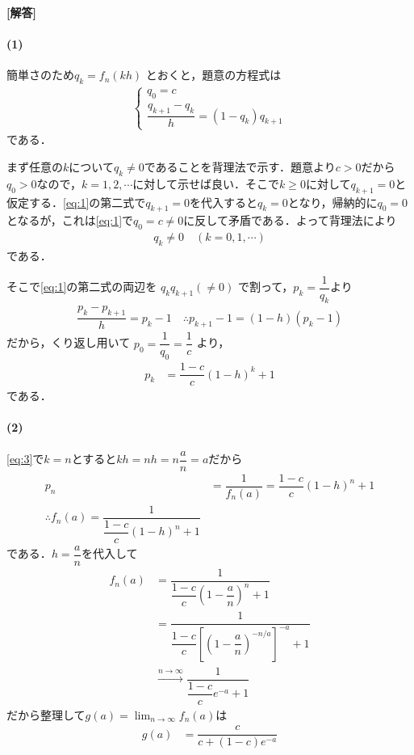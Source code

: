 \documentclass[../../main.tex]{subfiles}
\begin{document}
\begin{oframed}
  
\end{oframed}

{\bf [解答]}
\paragraph{(1)}

簡単さのため$q_k=f_n(kh)$ とおくと，題意の方程式は
\begin{align}
  \begin{cases}
    q_0 = c \\
    \dfrac{q_{k+1}-q_k}{h} = (1-q_k)q_{k+1}
  \end{cases} \label{eq:1}
\end{align}
である．

まず任意の$k$について$q_{k}\neq 0$であることを背理法で示す．題意より$c>0$だから$q_0>0$なので，$k=1,2,\cdots$に対して示せば良い．そこで$k \ge 0$に対して$q_{k+1}=0$と仮定する．\cref{eq:1}の第二式で$q_{k+1}=0$を代入すると$q_{k}=0$となり，帰納的に$q_0=0$となるが，これは\cref{eq:1}で$q_0=c \neq 0$に反して矛盾である．よって背理法により
\begin{align}
  q_{k} \neq 0 \quad (k=0,1,\cdots)\label{eq:2}
\end{align}
である．

そこで\cref{eq:1}の第二式の両辺を $q_k q_{k+1} (\neq 0)$ で割って，$p_k=\dfrac{1}{q_k}$より
\begin{align}
  \dfrac{p_k - p_{k+1}}{h} = p_k - 1 \quad \therefore p_{k+1} - 1 = (1-h)(p_k - 1)
\end{align}
だから，くり返し用いて $p_0 = \dfrac{1}{q_0}=\dfrac{1}{c}$ より，
\begin{align}
  p_k &= \dfrac{1-c}{c} (1-h)^k + 1 \label{eq:3}
\end{align}
である．

\paragraph{(2)}

\cref{eq:3}で$k=n$とすると$kh=nh=n\dfrac{a}{n}=a$だから
\begin{align}
  p_n &= \dfrac{1}{f_n(a)}=\dfrac{1-c}{c} (1-h)^n + 1 \\
  \therefore
  f_n(a) = \dfrac{1}{\dfrac{1-c}{c} (1-h)^n + 1}
\end{align}
である．$h=\dfrac{a}{n}$を代入して
\begin{align}
  f_n(a)
  &= \dfrac{1}{\dfrac{1-c}{c} \left(1-\dfrac{a}{n}\right)^n + 1} \\
  &= \dfrac{1}{\dfrac{1-c}{c} \left[\left(1-\dfrac{a}{n}\right)^{-n/a}\right]^{-a} + 1} \\
  &\xrightarrow{n\to\infty} \dfrac{1}{\dfrac{1-c}{c}e^{-a}+1}
\end{align}
だから整理して$g(a)=\lim_{n\to\infty}f_n(a)$は
\begin{align}
  g(a) &= \dfrac{c}{c + (1-c)e^{-a}} \label{eq:4}
\end{align}
\end{document}
